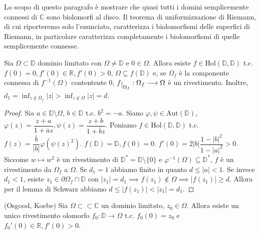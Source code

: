 Lo scopo di questo paragrafo è mostrare che quasi tutti i domini semplicemente connessi di $\mathbb{C}$ sono biolomorfi al disco. Il teorema di uniformizzazione di Riemann, di cui riporteremo solo l'enunciato, caratterizza i biolomorfismi delle superfici di Riemann, in particolare caratterizza completamente i biolomorfismi di quelle semplicemente connesse.

\begin{lm} \label{esistefinF}
  Sia $\Omega \subset \mathbb{D}$ dominio limitato con $\Omega \not=\mathbb{D}$ e $0 \in \Omega$.
  Allora esiste $f \in \text{Hol}(\mathbb{D}, \mathbb{D})$ t.c. $f(0)=0, f'(0) \in \mathbb{R}, f'(0)>0$, $\Omega \subseteq f(\mathbb{D})$ e, se $\Omega_f$ è la componente connessa di $f^{-1}(\Omega)$ contentente $0$, $f\restrict{\Omega_f}:\Omega_f \longrightarrow \Omega$ è un rivestimento.
  Inoltre, $\displaystyle d_1=\inf_{z \not\in \Omega_f} |z|>\inf_{z \not\in \Omega} |z|=d$.
\end{lm}

\begin{proof}
  Sia $a \in \mathbb{D}\setminus\Omega$, $b \in \mathbb{D}$ t.c. $b^2=-a$. Siano $\varphi, \psi \in \text{Aut}(\mathbb{D})$, $\varphi(z)=\dfrac{z+a}{1+\bar{a}z}, \psi(z)=\dfrac{z+b}{1+\bar{b}z}$.
  Poniamo $f \in \text{Hol}(\mathbb{D}, \mathbb{D})$ t.c. $f(z)=\dfrac{\bar{b}}{|b|}\varphi(\psi(z)^2)$. $f(\mathbb{D})=\mathbb{D}, f(0)=0$. $f'(0)=2|b|\dfrac{1-|b|^2}{1-|a|^2}>0$.
  Siccome $w \longmapsto w^2$ è un rivestimento di $\mathbb{D}^*=\mathbb{D}\setminus\{0\}$ e $\varphi^{-1}(\Omega) \subseteq \mathbb{D}^*$, $f$ è un rivestimento da $\Omega_f$ a $\Omega$. Se $d_1=1$ abbiamo finito in quanto $d \le |a|<1$.
  Se invece $d_1<1$, esiste $z_1 \in \partial\Omega_f \cap \mathbb{D}$ con $|z_1|=d_1 \implies f(z_1) \not\in \Omega \implies |f(z_1)| \ge d$. Allora per il lemma di Schwarz abbiamo $d \le |f(z_1)|<|z_1|=d_1$.
\end{proof}

\begin{thm}
  (Osgood, Koebe) Sia $\Omega \subset \subset \mathbb{C}$ un dominio limitato, $z_0 \in \Omega$. Allora esiste un unico rivestimento olomorfo $f_0:\mathbb{D} \longrightarrow \Omega$ t.c. $f_0(0)=z_0$ e $f_0'(0) \in \mathbb{R}, f'(0)>0$.
\end{thm}

